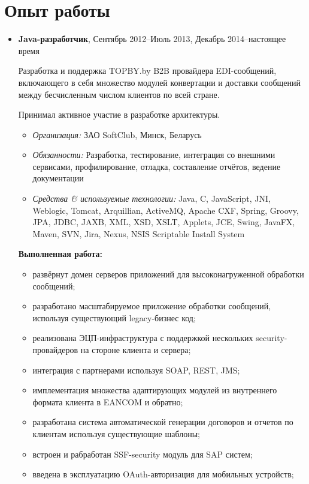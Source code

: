 \documentclass[a4paper, 12pt]{article}
\newcommand{\position}[1]{
    \textbf{#1}}
\newcommand{\itemlabel}[1]{
    \textit{#1:}}
\begin{document}
\section*{Опыт работы}

    \begin{itemize}
        \item \position{Java-разработчик}, Сентябрь 2012--Июль 2013, Декабрь 2014--настоящее время

            Разработка и поддержка TOPBY.by B2B провайдера EDI-сообщений, включающего в себя множество модулей конвертации и доставки сообщений  между бесчисленным числом клиентов по всей стране.

            Принимал активное участие в разработке архитектуры.
            	
            \begin{itemize}
                \item \itemlabel{Организация} ЗАО SoftClub, Минск, Беларусь
                \item \itemlabel{Обязанности} Разработка, тестирование, интеграция со внешними сервисами, 
                \newline профилирование, отладка, составление отчётов, ведение документации
                \item \itemlabel{Средства \& используемые технологии} Java, C, JavaScript, JNI, Weblogic, Tomcat, Arquillian, ActiveMQ, Apache CXF, Spring, Groovy, JPA, JDBC, JAXB, XML, XSD, XSLT, Applets, JCE, Swing, JavaFX, Maven, SVN, Jira, Nexus, NSIS Scriptable Install System
            \end{itemize}
            
            \textbf{Выполненная работа:}
			\begin{itemize}
  				\item развёрнут домен серверов приложений для высоконагруженной обработки сообщений;
  				\item разработано масштабируемое приложение обработки сообщений, используя существующий legacy-бизнес код;
				\item реализована ЭЦП-инфраструктура с поддержкой нескольких security-провайдеров на стороне клиента и сервера;
  				\item интеграция с партнерами используя SOAP, REST, JMS;
  				\item имплементация множества адаптирующих модулей из внутреннего формата клиента в EANCOM и обратно;
  				\item разработана система автоматической генерации договоров и отчетов по клиентам используя существующие шаблоны;
  				\item встроен и рабработан SSF-security модуль для SAP систем;
  				\item введена в эксплуатацию OAuth-авторизация для мобильных устройств;
			\end{itemize}
            

\end{itemize}
\end{document}

